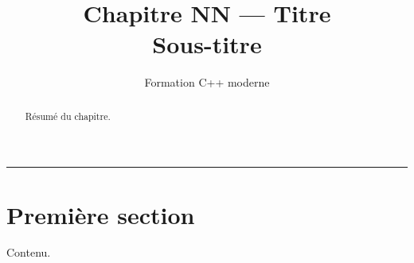 \documentclass[11pt]{article}
\title{\textbf{Chapitre NN — Titre}\\[0.3em]\large Sous-titre}
\author{Formation C++ moderne}
\date{}
\begin{document}
\maketitle

\begin{abstract}
\noindent Résumé du chapitre.
\end{abstract}

\tableofcontents
\bigskip\hrule\bigskip

\section{Première section}

Contenu.
\end{document}
